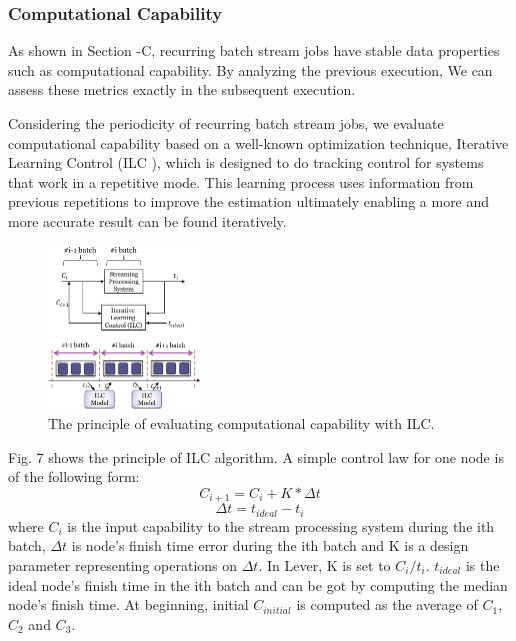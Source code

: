\subsubsection{Computational Capability}

  As shown in Section \uppercase\expandafter{}-C, recurring batch stream jobs have stable data properties such as computational capability. By analyzing the previous execution, We can assess these metrics exactly in the subsequent execution.

  Considering the periodicity of recurring batch stream jobs, we evaluate computational capability based on a well-known optimization technique, Iterative Learning Control (ILC \cite{Arimoto}), which is designed to do tracking control for systems that work in a repetitive mode. This learning process uses information from previous repetitions to improve the estimation ultimately enabling a more and more accurate result can be found iteratively.
  \begin{figure}[htbp]
    \centering
    \includegraphics[width=0.36\textwidth]{FigureILC}
    \caption{The principle of evaluating computational capability with ILC.}
    \label{Fig. 7:}
  \end{figure}

  Fig. 7 shows the principle of ILC algorithm. A simple control law for one node is of the following form:
  \begin{equation}
  C_{i+1} = C_i + K*\Delta t
  \end{equation}
   \begin{equation}
  \Delta t = t_{ideal} - t_{i}
  \end{equation}
  where $C_i$ is the input capability to the stream processing system during the ith batch, $\Delta t$ is node's finish time error during the ith batch and K is a design parameter representing operations on $\Delta t$. In Lever, K is set to $C_i/t_i$. $t_{ideal}$ is the ideal node's finish time in the ith batch and can be got by computing the median node's finish time. At beginning, initial $C_{initial}$ is computed as the average of $C_1$, $C_2$ and $C_3$.

